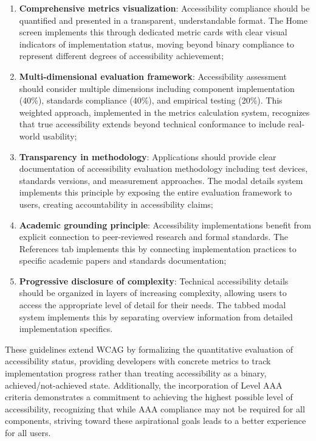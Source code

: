 \begin{enumerate}
    \item \textbf{Comprehensive metrics visualization}: Accessibility compliance should be quantified and presented in a transparent, understandable format. The Home screen implements this through dedicated metric cards with clear visual indicators of implementation status, moving beyond binary compliance to represent different degrees of accessibility achievement;
    
    \item \textbf{Multi-dimensional evaluation framework}: Accessibility assessment should consider multiple dimensions including component implementation (40\%), standards compliance (40\%), and empirical testing (20\%). This weighted approach, implemented in the metrics calculation system, recognizes that true accessibility extends beyond technical conformance to include real-world usability;
    
    \item \textbf{Transparency in methodology}: Applications should provide clear documentation of accessibility evaluation methodology including test devices, standards versions, and measurement approaches. The modal details system implements this principle by exposing the entire evaluation framework to users, creating accountability in accessibility claims;
    
    \item \textbf{Academic grounding principle}: Accessibility implementations benefit from explicit connection to peer-reviewed research and formal standards. The References tab implements this by connecting implementation practices to specific academic papers and standards documentation;
    
    \item \textbf{Progressive disclosure of complexity}: Technical accessibility details should be organized in layers of increasing complexity, allowing users to access the appropriate level of detail for their needs. The tabbed modal system implements this by separating overview information from detailed implementation specifics.
\end{enumerate}

These guidelines extend WCAG by formalizing the quantitative evaluation of accessibility status, providing developers with concrete metrics to track implementation progress rather than treating accessibility as a binary, achieved/not-achieved state. Additionally, the incorporation of Level AAA criteria demonstrates a commitment to achieving the highest possible level of accessibility, recognizing that while AAA compliance may not be required for all components, striving toward these aspirational goals leads to a better experience for all users.

